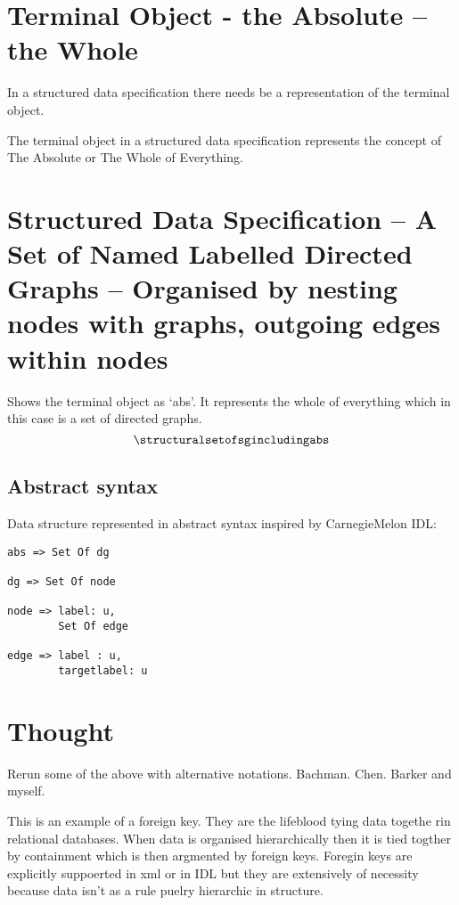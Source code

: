\documentclass[10pt,a4paper]{article}
\theoremstyle{remark}
\begin{document}
\section*{Terminal Object - the Absolute -- the Whole}
In a structured data specification there needs be a representation of the terminal object.

The terminal object in a structured data specification represents the concept of The Absolute or The Whole of Everything.


\section*{Structured Data Specification -- A Set of Named Labelled Directed Graphs -- Organised by nesting nodes with graphs, outgoing edges within nodes}
Shows the terminal object as `abs'. It represents the whole of everything which in this case is a set of directed graphs.
\begin{displaymath}
\structuralsetofsgincludingabs
\end{displaymath}

\subsection*{Abstract syntax}
Data structure represented in abstract syntax inspired by CarnegieMelon IDL:
\begin{verbatim}
abs => Set Of dg

dg => Set Of node

node => label: u,
        Set Of edge

edge => label : u,
        targetlabel: u

\end{verbatim}

\section*{Thought}
Rerun some of the above with alternative notations. Bachman. Chen. Barker and myself.

This is an example of a foreign key. They are the lifeblood tying data togethe rin relational databases. 
When data is organised hierarchically then it is tied togther by containment which is then argmented by foreign keys.
Foregin keys are explicitly suppoerted in xml or in IDL but they are extensively of necessity because data isn't as a rule puelry hierarchic in structure.
\end{document}
